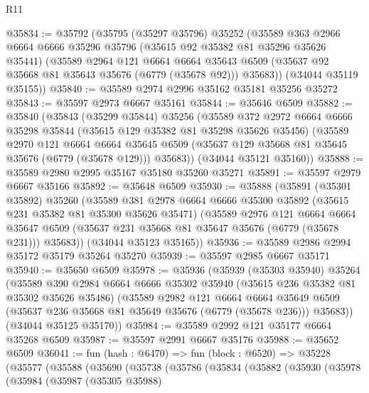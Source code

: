 \begin{lexlean}{R11}
\begin{coremodule}
@35834 := @35792
    (@35795
      (@35297 @35796)
      @35252
      (@35589
        @363
        @2966
        @6664
        @6666
        @35296
        @35796
        (@35615 @92 @35382 @81 @35296 @35626 @35441)
        (@35589
          @2964
          @121
          @6664
          @6664
          @35643
          @6509
          (@35637 @92 @35668 @81 @35643 @35676 (@6779 (@35678 @92)))
          @35683))
      (@34044 @35119 @35155))
@35840 := @35589 @2974 @2996 @35162 @35181 @35256 @35272
@35843 := @35597 @2973 @6667 @35161
@35844 := @35646 @6509
@35882 := @35840
    (@35843
      (@35299 @35844)
      @35256
      (@35589
        @372
        @2972
        @6664
        @6666
        @35298
        @35844
        (@35615 @129 @35382 @81 @35298 @35626 @35456)
        (@35589
          @2970
          @121
          @6664
          @6664
          @35645
          @6509
          (@35637 @129 @35668 @81 @35645 @35676 (@6779 (@35678 @129)))
          @35683))
      (@34044 @35121 @35160))
@35888 := @35589 @2980 @2995 @35167 @35180 @35260 @35271
@35891 := @35597 @2979 @6667 @35166
@35892 := @35648 @6509
@35930 := @35888
    (@35891
      (@35301 @35892)
      @35260
      (@35589
        @381
        @2978
        @6664
        @6666
        @35300
        @35892
        (@35615 @231 @35382 @81 @35300 @35626 @35471)
        (@35589
          @2976
          @121
          @6664
          @6664
          @35647
          @6509
          (@35637 @231 @35668 @81 @35647 @35676 (@6779 (@35678 @231)))
          @35683))
      (@34044 @35123 @35165))
@35936 := @35589 @2986 @2994 @35172 @35179 @35264 @35270
@35939 := @35597 @2985 @6667 @35171
@35940 := @35650 @6509
@35978 := @35936
    (@35939
      (@35303 @35940)
      @35264
      (@35589
        @390
        @2984
        @6664
        @6666
        @35302
        @35940
        (@35615 @236 @35382 @81 @35302 @35626 @35486)
        (@35589
          @2982
          @121
          @6664
          @6664
          @35649
          @6509
          (@35637 @236 @35668 @81 @35649 @35676 (@6779 (@35678 @236)))
          @35683))
      (@34044 @35125 @35170))
@35984 := @35589 @2992 @121 @35177 @6664 @35268 @6509
@35987 := @35597 @2991 @6667 @35176
@35988 := @35652 @6509
@36041 := fun (hash : @6470) =>
  fun (block : @6520) =>
  @35228
    (@35577
      (@35588
        (@35690
          (@35738
            (@35786
              (@35834
                (@35882
                  (@35930
                    (@35978
                      (@35984
                        (@35987
                          (@35305 @35988)

\end{coremodule}
\end{lexlean}
